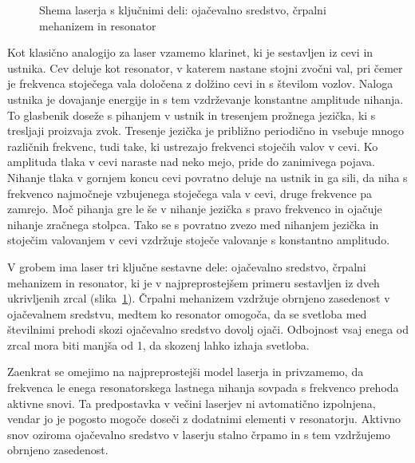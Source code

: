 \begin{figure}[h]
\centering
\def\svgwidth{100truemm} 

\caption{Shema laserja s ključnimi deli: ojačevalno sredstvo, črpalni mehanizem in resonator}
\label{fig:shemalaserja}
\end{figure}
\begin{remark}
Kot klasično analogijo za laser vzamemo klarinet, ki je sestavljen iz 
cevi in ustnika. Cev deluje kot resonator, v katerem nastane 
stojni zvočni val, pri čemer je frekvenca stoječega vala določena z 
dolžino cevi in s številom vozlov. Naloga ustnika je dovajanje energije 
in s tem vzdrževanje konstantne amplitude nihanja. To glasbenik doseže s 
pihanjem v ustnik in tresenjem prožnega jezička, ki s tresljaji proizvaja 
zvok. Tresenje jezička je približno periodično in vsebuje mnogo različnih 
frekvenc, tudi take, ki ustrezajo frekvenci stoječih valov v cevi. 
Ko amplituda tlaka v cevi naraste nad neko mejo, pride do zanimivega
pojava. Nihanje tlaka v gornjem koncu cevi povratno deluje na ustnik
in ga sili, da niha s frekvenco najmočneje vzbujenega stoječega vala v cevi,
druge frekvence pa zamrejo. Moč pihanja gre le še v
nihanje jezička s pravo frekvenco in ojačuje nihanje zračnega stolpca. 
Tako se s povratno zvezo med nihanjem jezička in stoječim valovanjem v cevi
vzdržuje stoječe valovanje s konstantno amplitudo. 
\end{remark}

V grobem ima laser tri ključne sestavne dele: ojačevalno sredstvo, 
črpalni mehanizem in resonator, ki je v najpreprostejšem primeru sestavljen iz dveh 
ukrivljenih zrcal (slika~\ref{fig:shemalaserja}). Črpalni 
mehanizem vzdržuje obrnjeno zasedenost v ojačevalnem sredstvu, medtem ko resonator 
omogoča, da se svetloba med številnimi prehodi skozi ojačevalno sredstvo dovolj ojači.
Odbojnost vsaj enega od zrcal 
mora biti manjša od 1, da skozenj lahko izhaja svetloba.

Zaenkrat se omejimo na najpreprostejši model laserja in 
privzamemo, da frekvenca le enega resonatorskega lastnega nihanja sovpada s 
frekvenco prehoda aktivne snovi. Ta predpostavka v večini laserjev ni
avtomatično izpolnjena, vendar jo je pogosto mogoče doseči z dodatnimi elementi 
v resonatorju. Aktivno snov oziroma ojačevalno sredstvo v laserju stalno 
črpamo in s tem vzdržujemo obrnjeno zasedenost. 

